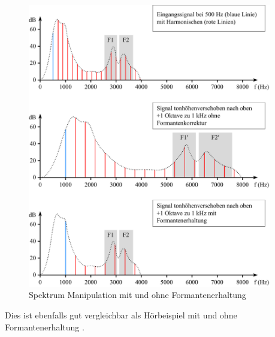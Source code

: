 \begin{figure}
    \centering
    \includegraphics[width=0.95\textwidth]{papers/autotune/images/Formanten-Erhaltung.pdf}
    \caption{Spektrum Manipulation mit und ohne Formantenerhaltung}
    \label{autotune:fig:formantenErhaltung}
\end{figure}
Dies ist ebenfalls gut vergleichbar als Hörbeispiel mit \cite{autotune:audioExamplePitchShiftingWithFormantPreservation} und ohne Formantenerhaltung \cite{autotune:audioExamplePitchShiftingWithoutFormantPreservation}.

